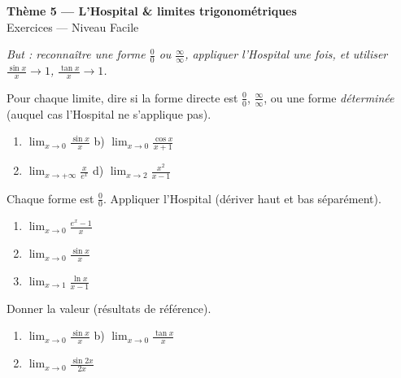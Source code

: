 \documentclass[11pt,a4paper]{article}
\begin{document}
\begin{center}
{\Large\bfseries\color{primarydark}Thème 5 — L'Hospital \& limites trigonométriques}\\[2pt]
{\large\color{primary}Exercices — Niveau Facile}
\end{center}
\vspace{4pt}
{\small\itshape But : reconnaître une forme $\frac00$ ou $\frac{\infty}{\infty}$, appliquer l'Hospital une
fois, et utiliser $\frac{\sin x}{x}\to 1$, $\frac{\tan x}{x}\to 1$.}
\vspace{6pt}

\begin{exercice}
Pour chaque limite, dire si la forme directe est $\frac00$, $\frac{\infty}{\infty}$, ou une forme
\emph{déterminée} (auquel cas l'Hospital ne s'applique pas).
\begin{enumerate}[label=\alph*),leftmargin=2em,itemsep=3pt]
  \item $\displaystyle\lim_{x\to 0}\frac{\sin x}{x}$ \qquad b) $\displaystyle\lim_{x\to 0}\frac{\cos x}{x+1}$
  \item $\displaystyle\lim_{x\to+\infty}\frac{x}{e^x}$ \qquad d) $\displaystyle\lim_{x\to 2}\frac{x^2}{x-1}$
\end{enumerate}
\end{exercice}

\begin{exercice}
Chaque forme est $\frac00$. Appliquer l'Hospital (dériver haut et bas séparément).
\begin{enumerate}[label=\alph*),leftmargin=2em,itemsep=3pt]
  \item $\displaystyle\lim_{x\to 0}\frac{e^x-1}{x}$
  \item $\displaystyle\lim_{x\to 0}\frac{\sin x}{x}$
  \item $\displaystyle\lim_{x\to 1}\frac{\ln x}{x-1}$
\end{enumerate}
\end{exercice}

\begin{exercice}
Donner la valeur (résultats de référence).
\begin{enumerate}[label=\alph*),leftmargin=2em,itemsep=3pt]
  \item $\displaystyle\lim_{x\to 0}\frac{\sin x}{x}$ \qquad b) $\displaystyle\lim_{x\to 0}\frac{\tan x}{x}$
  \item $\displaystyle\lim_{x\to 0}\frac{\sin 2x}{2x}$
\end{enumerate}
\end{exercice}
\end{document}

